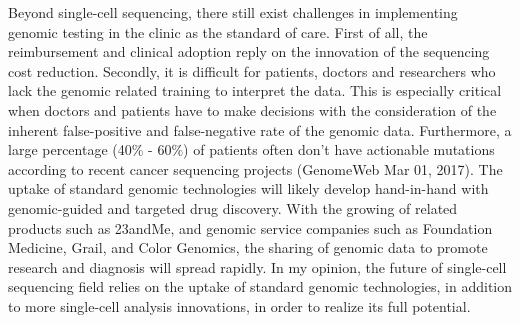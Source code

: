 Beyond single-cell sequencing, there still exist challenges in implementing genomic testing in the clinic as the standard of care. First of all, the reimbursement and clinical adoption reply on the innovation of the sequencing cost reduction. Secondly, it is difficult for patients, doctors and researchers who lack the genomic related training to interpret the data. This is especially critical when doctors and patients have to make decisions with the consideration of the inherent false-positive and false-negative rate of the genomic data. Furthermore, a large percentage (40$\%$ - 60$\%$) of patients often don't have actionable mutations according to recent cancer sequencing projects (GenomeWeb Mar 01, 2017). The uptake of standard genomic technologies will likely develop hand-in-hand with genomic-guided and targeted drug discovery. With the growing of related products such as 23andMe, and genomic service companies such as Foundation Medicine, Grail, and Color Genomics, the sharing of genomic data to promote research and diagnosis will spread rapidly. In my opinion, the future of single-cell sequencing field relies on the uptake of standard genomic technologies, in addition to more single-cell analysis innovations, in order to realize its full potential.
